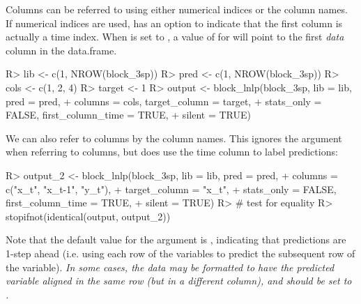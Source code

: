 \documentclass[article]{jss}
\begin{document}
Columns can be referred to using either numerical indices or the column names. If numerical indices are used,  has an option to indicate that the first column is actually a time index. When  is set to , a value of  for  will point to the first \emph{data} column in the data.frame.

\begin{Schunk}
\begin{Sinput}
R> lib <- c(1, NROW(block_3sp))
R> pred <- c(1, NROW(block_3sp))
R> cols <- c(1, 2, 4)
R> target <- 1
R> output <- block_lnlp(block_3sp, lib = lib, pred = pred,
+                       columns = cols, target_column = target,
+                       stats_only = FALSE, first_column_time = TRUE, 
+                       silent = TRUE)
\end{Sinput}
\end{Schunk}

We can also refer to columns by the column names. This ignores the  argument when referring to columns, but does use the time column to label predictions:

\begin{Schunk}
\begin{Sinput}
R> output_2 <- block_lnlp(block_3sp, lib = lib, pred = pred,
+                         columns = c("x_t", "x_t-1", "y_t"), 
+                         target_column = "x_t",
+                         stats_only = FALSE, first_column_time = TRUE, 
+                         silent = TRUE)
R> # test for equality
R> stopifnot(identical(output, output_2))
\end{Sinput}
\end{Schunk}

Note that the default value for the  argument is , indicating that predictions are 1-step ahead (i.e. using each row of the  variables to predict the subsequent row of the  variable). \emph{In some cases, the data may be formatted to have the predicted variable aligned in the same row (but in a different column), and  should be set to .}
\end{document}
